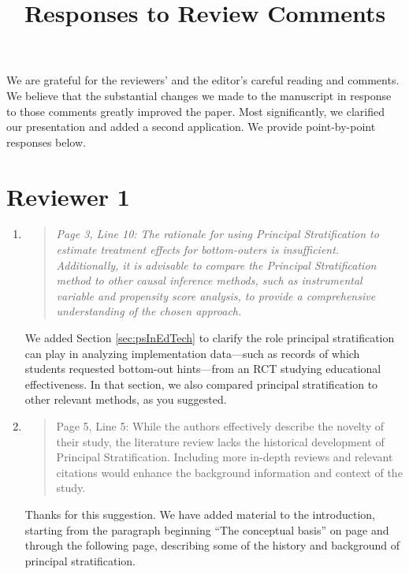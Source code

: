 \documentclass[]{article}
\title{Responses to Review Comments}
\date{}
\newenvironment{itquote}
  {\begin{quote} \itshape}
  {\end{quote}\ignorespacesafterend}
\begin{document}
\maketitle
We are grateful for the reviewers' and the editor's careful reading
and comments. We believe that the substantial changes we made
to the manuscript in response to those comments greatly
improved the paper. Most significantly, we clarified our presentation
and added a second application.
We provide point-by-point responses below.

\section*{Reviewer 1}


\begin{enumerate}
 
\item    \begin{itquote}  Page 3, Line 10: The rationale for using Principal Stratification to estimate treatment effects for bottom-outers is insufficient. Additionally, it is advisable to compare the Principal Stratification method to other causal inference methods, such as instrumental variable and propensity score analysis, to provide a comprehensive understanding of the chosen approach.
\end{itquote}

We added Section \ref{sec:psInEdTech} to clarify the role principal stratification can play in analyzing implementation data---such as records of which students requested bottom-out hints---from an RCT studying educational effectiveness. 
In that section, we also compared principal stratification to other relevant methods, as you suggested. 

\item \begin{itquote}
    
     Page 5, Line 5: While the authors effectively describe the novelty of their study, the literature review lacks the historical development of Principal Stratification. Including more in-depth reviews and relevant citations would enhance the background information and context of the study.
\end{itquote}

Thanks for this suggestion. We have added material to the introduction, starting from the paragraph beginning ``The conceptual basis'' on page \pageref{background} and through the following page, describing some of the history and background of principal stratification. 


\end{enumerate}
\end{document}
